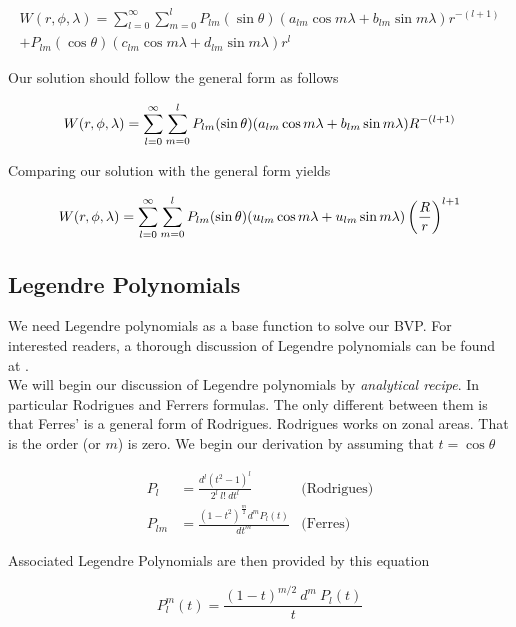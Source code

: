 \begin{align*}
W(r, \phi, \lambda) = \sum_{l=0}^{\infty}\sum_{m=0}^{l}P_{lm}(\sin \theta)(a_{lm} \cos m \lambda + b_{lm}\sin m \lambda) r^{-(l+1)}\\
+P_{lm}(\cos \theta)(c_{lm} \cos m \lambda + d_{lm} \sin m \lambda)r^l
\end{align*} 

Our solution should follow the general form as follows

\begin{equation}
W(r, \phi, \lambda) = \sum_{l=0}^{\infty}\sum_{m=0}^{l}P_{lm}(\sin \theta)(a_{lm} \cos m \lambda \\
+ b_{lm} \sin m \lambda) R^{-(l+1)}
\end{equation}

Comparing our solution with the general form yields

\begin{equation}
W(r, \phi, \lambda) = \sum_{l=0}^{\infty}\sum_{m=0}^{l}P_{lm}(\sin \theta)(u_{lm} \cos m \lambda \\
+ u_{lm} \sin m \lambda) \left(\frac{R}{r}\right)^{l+1}
\end{equation}


\subsection{Legendre Polynomials}
We need Legendre polynomials as a base function to solve our BVP. For interested readers, a thorough discussion of Legendre polynomials can be found at \cite{meziani}. 
\\
We will begin our discussion of Legendre polynomials by \textit{analytical recipe}. In particular Rodrigues and Ferrers formulas. The only different between them is that Ferres' is a general form of Rodrigues. Rodrigues works on zonal areas. That is the order (or $m$) is zero. We begin our derivation by assuming that $t=\cos \theta$

\begin{align}
	P_{l} &= \frac{d^l(t^2-1)^l}{2^l\ l!\ dt^l} &\text{(Rodrigues)}\\
	P_{lm} &= \frac{(1-t^2)^{\tfrac{m}{2}}d^mP_{l}(t)}{dt^m} &\text{(Ferres)}
\end{align}

Associated Legendre Polynomials are then provided by this equation

\begin{equation}
P_{l}^{m}(t) = \frac{(1-t)^{m/2}\ d^m\ P_l(t)}{t}
\end{equation}

